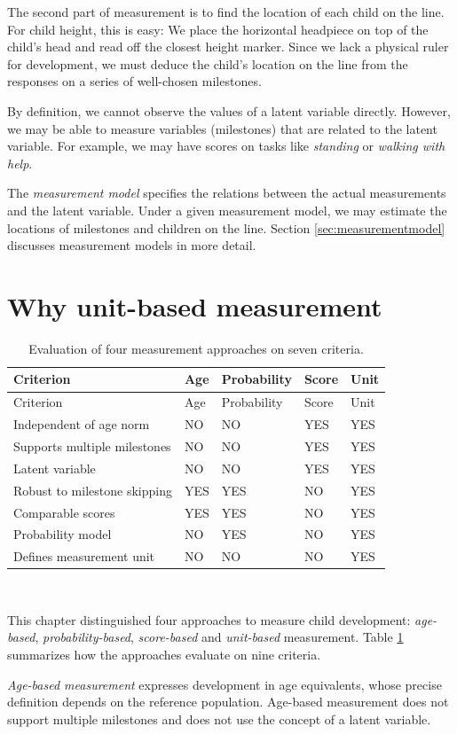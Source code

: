 \documentclass[
]{book}
\begin{document}
The second part of measurement is to find the location of each child on the line. For child height, this is easy: We place the horizontal headpiece on top of the child's head and read off the closest height marker. Since we lack a physical ruler for development, we must deduce the child's location on the line from the responses on a series of well-chosen milestones.

By definition, we cannot observe the values of a latent variable directly. However, we may be able to measure variables (milestones) that are related to the latent variable. For example, we may have scores on tasks like \emph{standing} or \emph{walking with help}.

The \emph{measurement model} specifies the relations between the actual measurements and the latent variable. Under a given measurement model, we may estimate the locations of milestones and children on the line. Section \ref{sec:measurementmodel} discusses measurement models in more detail.

\hypertarget{sec:whyunit}{%
\section{Why unit-based measurement}\label{sec:whyunit}}

\begin{longtable}[]{@{}lllll@{}}
\caption{\label{tab:measurement} Evaluation of four measurement approaches on seven criteria.}\tabularnewline
\toprule
Criterion & Age & Probability & Score & Unit\tabularnewline
\midrule
\endfirsthead
\toprule
Criterion & Age & Probability & Score & Unit\tabularnewline
\midrule
\endhead
Independent of age norm & NO & NO & YES & YES\tabularnewline
Supports multiple milestones & NO & NO & YES & YES\tabularnewline
Latent variable & NO & NO & YES & YES\tabularnewline
Robust to milestone skipping & YES & YES & NO & YES\tabularnewline
Comparable scores & YES & YES & NO & YES\tabularnewline
Probability model & NO & YES & NO & YES\tabularnewline
Defines measurement unit & NO & NO & NO & YES\tabularnewline
\bottomrule
\end{longtable}

~

This chapter distinguished four approaches to measure child development: \emph{age-based}, \emph{probability-based}, \emph{score-based} and \emph{unit-based} measurement. Table \ref{tab:measurement} summarizes how the approaches evaluate on nine criteria.

\emph{Age-based measurement} expresses development in age equivalents, whose precise definition depends on the reference population. Age-based measurement does not support multiple milestones and does not use the concept of a latent variable.
\end{document}
